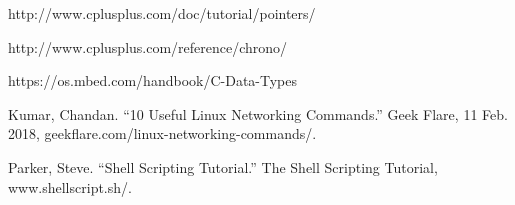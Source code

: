 {\footnotesize
\begin{thebibliography}{99}
	 http://www.cplusplus.com/doc/tutorial/pointers/
	
	 http://www.cplusplus.com/reference/chrono/
	
	 https://os.mbed.com/handbook/C-Data-Types
	
	 Kumar, Chandan. “10 Useful Linux Networking Commands.” Geek Flare, 11 Feb. 2018, geekflare.com/linux-networking-commands/. 
	
	  Parker, Steve. “Shell Scripting Tutorial.” The Shell Scripting Tutorial, www.shellscript.sh/. 
\end{thebibliography}
}
